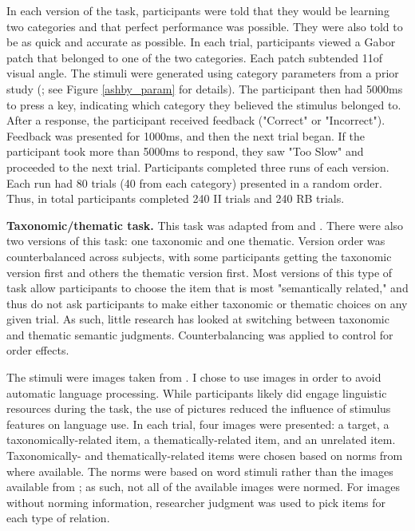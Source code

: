 \documentclass[../dissertation.tex]{subfiles}
\begin{document}
In each version of the task, participants were told that they would be learning two categories and that perfect performance was possible. They were also told to be as quick and accurate as possible. In each trial, participants viewed a Gabor patch that belonged to one of the two categories. Each patch subtended 11\degree  of visual angle. The stimuli were generated using category parameters from a prior study (\citealp{Maddox2003}; see Figure \ref{ashby_param} for details).  The participant then had 5000ms to press a key, indicating which category they believed the stimulus belonged to. After a response, the participant received feedback ("Correct" or "Incorrect"). Feedback was presented for 1000ms, and then the next trial began. If the participant took more than 5000ms to respond, they saw "Too Slow" and proceeded to the next trial. Participants completed three runs of each version. Each run had 80 trials (40 from each category) presented in a random order. Thus, in total participants completed 240 II trials and 240 RB trials. \par
\textbf{Taxonomic/thematic task.} This task was adapted from \citet{Murphy2001} and \citet{Kalenine2009}. There were also two versions of this task: one taxonomic and one thematic. Version order was counterbalanced across subjects, with some participants getting the taxonomic version first and others the thematic version first. Most versions of this type of task allow participants to choose the item that is most "semantically related," and thus do not ask participants to make either taxonomic or thematic choices on any given trial. As such, little research has looked at switching between taxonomic and thematic semantic judgments. Counterbalancing was applied to control for order effects. \par
The stimuli were images taken from \citet{Konkle2010}. I chose to use images in order to avoid automatic language processing. While participants likely did engage linguistic resources during the task, the use of pictures reduced the influence of stimulus features on language use. In each trial, four images were presented: a target, a taxonomically-related item, a thematically-related item, and an unrelated item. Taxonomically- and thematically-related items were chosen based on norms from \citet{Landrigan2016} where available. The \citet{Landrigan2016} norms were based on word stimuli rather than the images available from \citet{Konkle2010}; as such, not all of the available images were normed. For images without norming information, researcher judgment was used to pick items for each type of relation. \par
\end{document}
